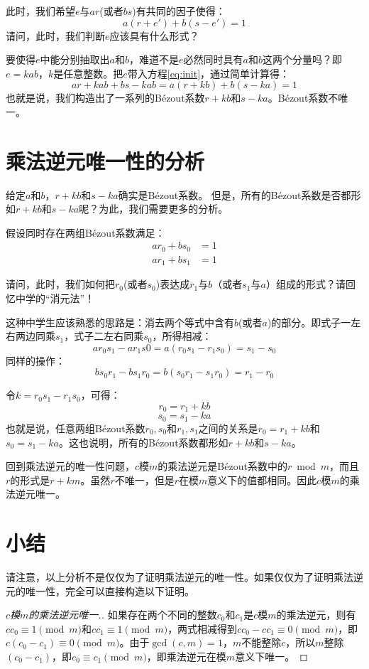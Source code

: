 \documentclass[12pt,a4paper]{ctexart}
\theoremstyle{plain}
\theoremstyle{definition}
\theoremstyle{remark}
\begin{document}
此时，我们希望$e$与$ar$(或者$bs$)有共同的因子使得：
		\[ a(r + e') + b(s - e') = 1\]
请问，此时，我们判断$e$应该具有什么形式？

要使得$e$中能分别抽取出$a$和$b$，难道不是$e$必然同时具有$a$和$b$这两个分量吗？即$e = kab$，$k$是任意整数。把$e$带入方程\ref{eq:init}，通过简单计算得：
		\[ a r + kab + bs - kab = a(r +kb) + b(s - ka) = 1\]
也就是说，我们构造出了一系列的B\'ezout系数$r + kb$和$s -k a$。B\'ezout系数不唯一。

\section{乘法逆元唯一性的分析}
给定$a$和$b$，$r + kb$和$s -k a$确实是B\'ezout系数。
但是，所有的B\'ezout系数是否都形如$r + kb$和$s -k a$呢？为此，我们需要更多的分析。

假设同时存在两组B\'ezout系数满足：
\begin{align*}
  a r_0 + b s_0 &= 1\\
  a r_1 + b s_1 &= 1
\end{align*}

请问，此时，我们如何把$r_0$(或者$s_0$)表达成$r_1$与$b$（或者$s_1$与$a$）组成的形式？请回忆中学的“消元法”！


这种中学生应该熟悉的思路是：消去两个等式中含有$b$(或者$a$)的部分。即式子一左右两边同乘$s_1$，式子二左右同乘$s_0$，所得相减：
		\[ a r_0 s_1 - a r_1 s0 = a(r_0 s_1 - r_1 s_0) = s_1 - s_0\]
同样的操作：
		\[b s_0 r_1 - b s_1 r_0 = b(s_0 r_1 - s_1 r_0) = r_1 - r_0\]

		令$k = r_0 s_1 - r_1 s_0$，可得：
		\[r_0 = r_1 + kb\]
		\[s_0 = s_1 - ka \]
  也就是说，任意两组B\'ezout系数$r_0, s_0$和$r_1, s_1$之间的关系是$r_0 = r_1 + kb$和$s_0 = s_1 - ka$。这也说明，所有的B\'ezout系数都形如$r + kb$和$s -k a$。

  回到乘法逆元的唯一性问题，$c$模$m$的乘法逆元是B\'ezout系数中的$r \bmod m$，而且$r$的形式是$r + km$。虽然$r$不唯一，但是$r$在模$m$意义下的值都相同。因此$c$模$m$的乘法逆元唯一。

\section{小结}
请注意，以上分析不是仅仅为了证明乘法逆元的唯一性。如果仅仅为了证明乘法逆元的唯一性，完全可以直接构造以下证明。
\begin{proof}[$c$模$m$的乘法逆元唯一.]
如果存在两个不同的整数$c_0$和$c_1$是$c$模$m$的乘法逆元，则有$cc_0 \equiv 1 \pmod{m}$和$cc_1 \equiv 1 \pmod{m}$，两式相减得到$cc_0 - cc_1 \equiv 0 \pmod{m}$，即$c(c_0 - c_1) \equiv 0 \pmod{m}$。由于$\gcd(c, m) = 1$，$m$不能整除$c$，所以$m$整除$(c_0 - c_1)$，即$c_0 \equiv c_1 \pmod{m}$，即乘法逆元在模$m$意义下唯一。
\end{proof}
\end{document}
